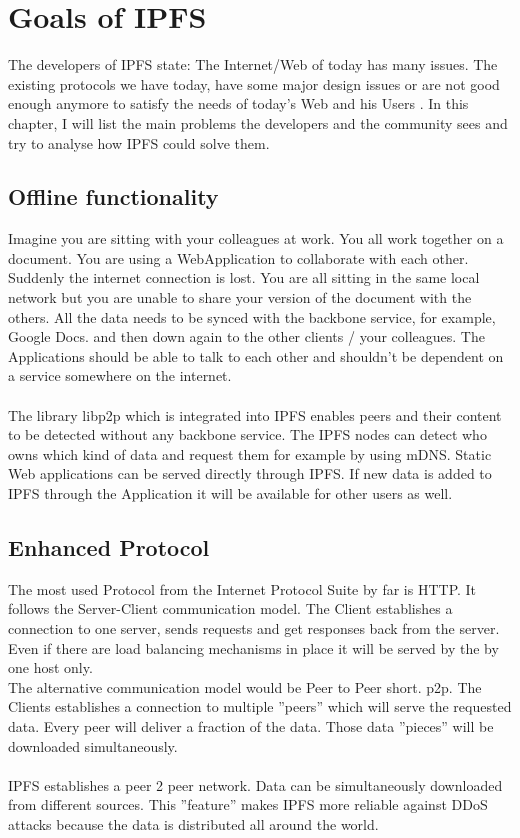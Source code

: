 \documentclass[a4paper,11pt, oneside]{report}
\theoremstyle{definition}
\begin{document}
\chapter{Goals of IPFS}
The developers of IPFS  state: The Internet/Web of today has many issues.  The existing protocols we have today, have some major design issues or are not good enough anymore to satisfy the needs of today's Web and his Users \cite{TodaysProblems}. In this chapter, I will list the main problems the developers and the community sees and try to analyse how IPFS could solve them.

\section{Offline functionality}
Imagine you are sitting with your colleagues at work. You all work together on a document. You are using a WebApplication to collaborate with each other. Suddenly the internet connection is lost. You are all sitting in the same local network but you are unable to share your version of the document with the others. All the data needs to be synced with the backbone service, for example, Google Docs. and then down again to the other clients / your colleagues. The Applications should be able to talk to each other and shouldn't be dependent on a service somewhere on the internet.\\ \\
The library libp2p which is integrated into IPFS enables peers and their content to be detected without any backbone service. The IPFS nodes can detect who owns which kind of data and request them for example by using mDNS. Static Web applications can be served directly through IPFS. If new data is added to IPFS through the Application it will be available for other users as well.

\section{Enhanced Protocol}
The most used Protocol from the Internet Protocol Suite by far is HTTP. It follows the Server-Client communication model. The Client establishes a connection to one server, sends requests and get responses back from the server. Even if there are load balancing mechanisms in place it will be served by the by one host only.\\[0.3cm]
The alternative communication model would be Peer to Peer short. p2p. The Clients establishes a connection to multiple ''peers'' which will serve the requested data. Every peer will deliver a fraction of the data. Those data ''pieces'' will be downloaded simultaneously.\\ \\
IPFS establishes a peer 2 peer network. Data can be simultaneously downloaded from different sources. This ''feature'' makes IPFS more reliable against DDoS attacks because the data is distributed all around the world.
\end{document}
